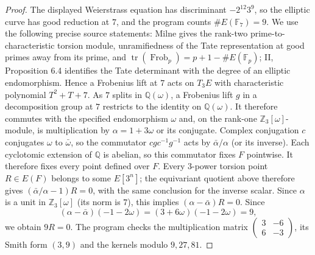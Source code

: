 \begin{proof}
The displayed Weierstrass equation has discriminant $-2^{12}3^9$, so
the elliptic curve has good reduction at $7$, and the program counts
$\#E(\mathbb F_7)=9$.  We use the following precise source statements:
Milne \cite[II, Proposition 6.3; V, Propositions 8.1 and 8.3]{D_MilneEC}
gives the rank-two prime-to-characteristic torsion module, unramifiedness
of the Tate representation at good primes away from its prime, and
$\operatorname{tr}(\operatorname{Frob}_p)=p+1-\#E(\mathbb F_p)$;
II, Proposition 6.4 identifies the Tate determinant with the degree of
an elliptic endomorphism.  Hence a Frobenius lift at $7$ acts on $T_3E$
with characteristic polynomial $T^2+T+7$.  As $7$ splits in
$\mathbb Q(\omega)$, a Frobenius lift $g$ in a decomposition group at $7$
restricts to the identity on $\mathbb Q(\omega)$.  It therefore commutes
with the specified endomorphism $\omega$ and, on the rank-one
$\mathbb Z_3[\omega]$-module, is multiplication by
$\alpha=1+3\omega$ or its conjugate.
Complex conjugation $c$ conjugates $\omega$ to $\bar\omega$, so the
commutator $cgc^{-1}g^{-1}$ acts by
$\bar\alpha/\alpha$ (or its inverse).  Each cyclotomic extension of
$\mathbb Q$ is abelian, so this commutator fixes $F$ pointwise.  It
therefore fixes every point defined over $F$.  Every $3$-power torsion point
$R\in E(F)$ belongs to some $E[3^n]$; the equivariant quotient above
therefore gives $(\bar\alpha/\alpha-1)R=0$, with the same conclusion
for the inverse scalar.  Since $\alpha$ is a unit in
$\mathbb Z_3[\omega]$ (its norm is $7$), this implies
$(\alpha-\bar\alpha)R=0$.
Since
\[
 (\alpha-\bar\alpha)(-1-2\omega)
 =(3+6\omega)(-1-2\omega)=9,
\]
we obtain $9R=0$.  The program checks the multiplication matrix
$\left(\begin{smallmatrix}3&-6\\6&-3\end{smallmatrix}\right)$,
its Smith form $(3,9)$ and the kernels modulo $9,27,81$.


\end{proof}
